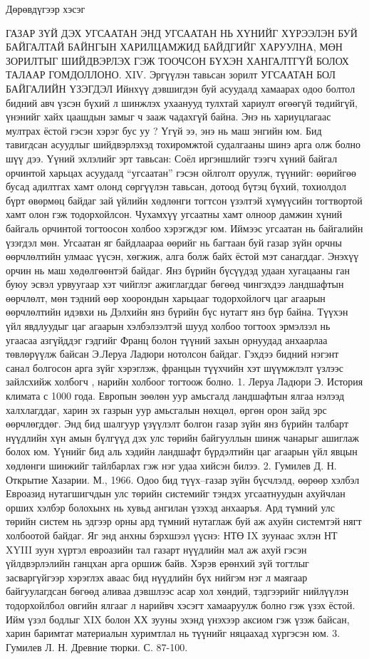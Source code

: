 Дөрөвдүгээр хэсэг

ГАЗАР ЗҮЙ ДЭХ УГСААТАН
ЭНД УГСААТАН НЬ ХҮНИЙГ ХҮРЭЭЛЭН БУЙ БАЙГАЛТАЙ БАЙНГЫН ХАРИЛЦАМЖИД БАЙДГИЙГ ХАРУУЛНА, МӨН ЗОРИЛТЫГ ШИЙДВЭРЛЭХ ГЭЖ ТООЧСОН БҮХЭН ХАНГАЛТГҮЙ БОЛОХ ТАЛААР ГОМДОЛЛОНО.
XIV. Эргүүлэн тавьсан зорилт
УГСААТАН БОЛ БАЙГАЛИЙН ҮЗЭГДЭЛ
Ийнхүү дэвшигдэн буй асуудалд хамаарах одоо болтол бидний авч үзсэн бүхий л шинжлэх ухаанууд тулхтай хариулт өгөөгүй төдийгүй, үнэнийг хайх цаашдын замыг ч зааж чадахгүй байна. Энэ нь хариуцлагаас мултрах ёстой гэсэн хэрэг бус уу ? Үгүй ээ, энэ нь маш энгийн юм. Бид тавигдсан асуудлыг шийдвэрлэхэд тохиромжтой судалгааны шинэ арга олж болно шүү дээ. Үүний эхлэлийг эрт тавьсан: Соёл иргэншлийг тээгч хүний байгал орчинтой харьцах асуудалд “угсаатан” гэсэн ойлголт оруулж, түүнийг: өөрийгөө бусад адилтгах хамт олонд сөргүүлэн тавьсан, дотоод бүтэц бүхий, тохиолдол бүрт өвөрмөц байдаг зай үйлийн хөдлөнги тогтсон үзэлтэй хүмүүсийн тогтвортой хамт олон гэж тодорхойлсон. Чухамхүү угсаатны хамт олноор дамжин хүний байгаль орчинтой тогтоосон холбоо хэрэгждэг юм. Иймээс угсаатан нь байгалийн үзэгдэл мөн.
Угсаатан яг байдлаараа өөрийг нь багтаан буй газар зүйн орчны өөрчлөлтийн улмаас үүсэн, хөгжиж, алга болж байх ёстой мэт санагддаг. Энэхүү орчин нь маш хөдөлгөөнтэй байдаг. Янз бүрийн бүсүүдэд удаан хугацааны ган буюу эсвэл урвуугаар хэт чийглэг ажиглагддаг бөгөөд чингэхдээ ландшафтын өөрчлөлт, мөн тэдний өөр хоорондын харьцааг тодорхойлогч цаг агаарын өөрчлөлтийн идэвхи нь Дэлхийн янз бүрийн бүс нутагт янз бүр байна. Түүхэн үйл явдлуудыг цаг агаарын хэлбэлзэлтэй шууд холбоо тогтоох эрмэлзэл нь угаасаа азгүйддэг гэдгийг Франц болон түүний захын орнуудад анхаарлаа төвлөрүүлж байсан Э.Леруа Ладюри нотолсон байдаг. Гэхдээ бидний нэгэнт санал болгосон арга зүйг хэрэглэж, францын түүхчийн хэт шүүмжлэлт үзлээс зайлсхийж холбогч , нарийн холбоог тогтоож болно. 1. Леруа Ладюри Э. История климата с 1000 года.
Европын зөөлөн уур амьсгалд ландшафтын ялгаа нэлээд халхлагддаг, харин эх газрын уур амьсгалын нөхцөл, өргөн орон зайд эрс өөрчлөгддөг. Энд бид шалгуур үзүүлэлт болгон газар зүйн янз бүрийн талбарт нүүдлийн хүн амын бүлгүүд дэх улс төрийн байгууллын шинж чанарыг ашиглаж болох юм. Үүнийг бид аль хэдийн ландшафт бүрдэлтийн цаг агаарын үйл явцын хөдлөнги шинжийг тайлбарлах гэж нэг удаа хийсэн билээ. 2. Гумилев Д. Н. Открытие Хазарии. М., 1966.
Одоо бид түүх–газар зүйн бүсчлэлд, өөрөөр хэлбэл Евроазид нутагшигчдын улс төрийн системийг тэндэх угсаатнуудын ахуйчлан орших хэлбэр болохынх нь хувьд ангилан үзэхэд анхааръя.
Ард түмний улс төрийн систем нь эдгээр орны ард түмний нутаглаж буй аж ахуйн системтэй нягт холбоотой байдаг. Яг энд анхны бэрхшээл үүснэ: НТӨ IX зуунаас эхлэн НТ XYIII зуун хүртэл евроазийн тал газарт нүүдлийн мал аж ахуй гэсэн үйлдвэрлэлийн ганцхан арга оршиж байв. Хэрэв ерөнхий зүй тогтлыг засваргүйгээр хэрэглэх аваас бид нүүдлийн бүх нийгэм нэг л маягаар байгуулагдсан бөгөөд аливаа дэвшлээс асар хол хөндий, тэдгээрийг нийлүүлэн тодорхойлбол овгийн ялгааг л нарийвч хэсэгт хамааруулж болно гэж үзэх ёстой. Ийм үзэл бодлыг XIX болон ХХ зууны эхэнд үнэхээр аксиом гэж үзэж байсан, харин баримтат материалын хуримтлал нь түүнийг няцаахад хүргэсэн юм. 3. Гумилев Л. Н. Древние тюрки. С. 87-100.
